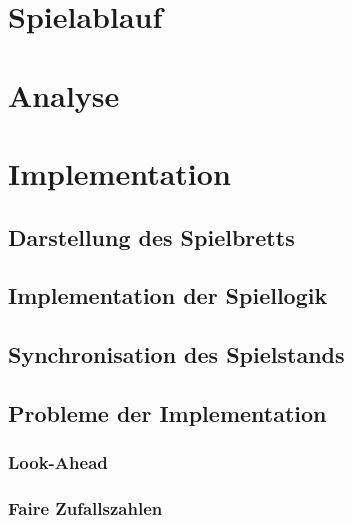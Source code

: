 \section{Spielablauf}
\section{Analyse}
\section{Implementation}
\subsection{Darstellung des Spielbretts}
\subsection{Implementation der Spiellogik}
\subsection{Synchronisation des Spielstands}
\subsection{Probleme der Implementation}
\subsubsection{Look-Ahead}
\subsubsection{Faire Zufallszahlen}
